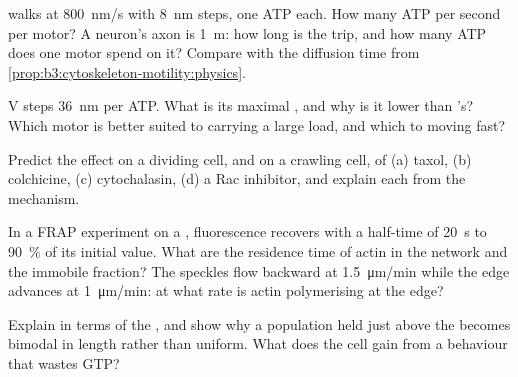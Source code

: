 \begin{exercise}[$\star\star$]\label{exo:b3:cytoskeleton-motility:6}
 walks at \qty{800}{nm/s} with \qty{8}{nm} steps, one ATP each.
How many ATP per second per motor? A neuron's axon is \qty{1}{m}: how
long is the trip, and how many ATP does one motor spend on it? Compare
with the diffusion time from \cref{prop:b3:cytoskeleton-motility:physics}.
\end{exercise}

\begin{exercise}[$\star\star$]\label{exo:b3:cytoskeleton-motility:7}
 V steps \qty{36}{nm} per ATP. What is its maximal ,
and why is it lower than 's? Which motor is better suited to
carrying a large load, and which to moving fast?
\end{exercise}

\begin{exercise}[$\star\star$]\label{exo:b3:cytoskeleton-motility:8}
Predict the effect on a dividing cell, and on a crawling cell, of (a)
taxol, (b) colchicine, (c) cytochalasin, (d) a Rac inhibitor, and
explain each from the mechanism.
\end{exercise}

\begin{exercise}[$\star\star$]\label{exo:b3:cytoskeleton-motility:9}
In a FRAP experiment on a , fluorescence recovers with a
half-time of \qty{20}{s} to \qty{90}{\%} of its initial value. What are
the residence time of actin in the network and the immobile fraction?
The speckles flow backward at \qty{1.5}{\micro m/min} while the edge
advances at \qty{1}{\micro m/min}: at what rate is actin polymerising
at the edge?
\end{exercise}

\begin{exercise}[$\star\star\star$]\label{exo:b3:cytoskeleton-motility:10}
Explain  in terms of the , and show why a
 population held just above the 
becomes bimodal in length rather than uniform. What does the cell gain
from a behaviour that wastes GTP?
\end{exercise}

